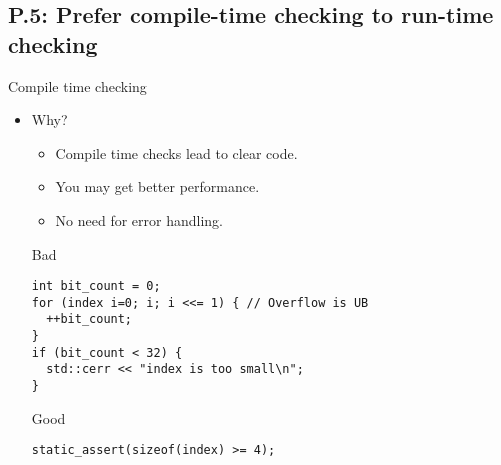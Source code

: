 \subsection{P.5: Prefer compile-time checking to run-time checking}

\begin{frame}[t,fragile]{Compile time checking}
\begin{itemize}
  \item Why?
    \begin{itemize}
      \item Compile time checks lead to clear code.
      \item You may get better performance.
      \item No need for error handling.
    \end{itemize}

\pause
\begin{block}{Bad}
\begin{lstlisting}
int bit_count = 0;
for (index i=0; i; i <<= 1) { // Overflow is UB
  ++bit_count;
}
if (bit_count < 32) {
  std::cerr << "index is too small\n";
}
\end{lstlisting}
\end{block}

\pause
\begin{block}{Good}
\begin{lstlisting}
static_assert(sizeof(index) >= 4);
\end{lstlisting}
\end{block}

\end{itemize}
\end{frame}
